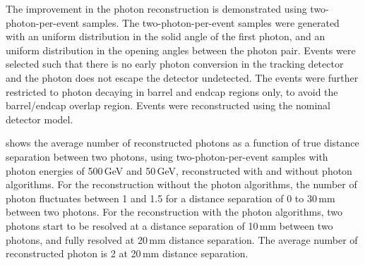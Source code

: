 The improvement in the photon reconstruction is demonstrated using  two-photon-per-event samples. The two-photon-per-event samples were generated with an uniform distribution in the solid angle of the first photon, and an uniform distribution in the opening angles  between the photon pair. Events were selected such that there is no early photon conversion in the tracking detector and the photon does not escape the detector undetected. The events were further restricted to photon decaying in barrel and endcap regions only, to avoid the barrel/endcap overlap region. Events were reconstructed using the nominal \ILD detector model.


 shows the average number of reconstructed photons as a function of true distance separation between two photons,   using  two-photon-per-event samples
with photon energies of  500\,GeV and 50\,GeV,   reconstructed with and without photon algorithms. For the reconstruction without the photon algorithms, the number of photon fluctuates between 1 and 1.5 for a distance separation of 0 to 30\,mm between two photons.  For the reconstruction with the photon algorithms, two photons start to be resolved at a distance separation  of 10\,mm between two photons, and fully resolved at 20\,mm distance separation.  The average number of reconstructed photon is 2 at 20\,mm distance separation.



